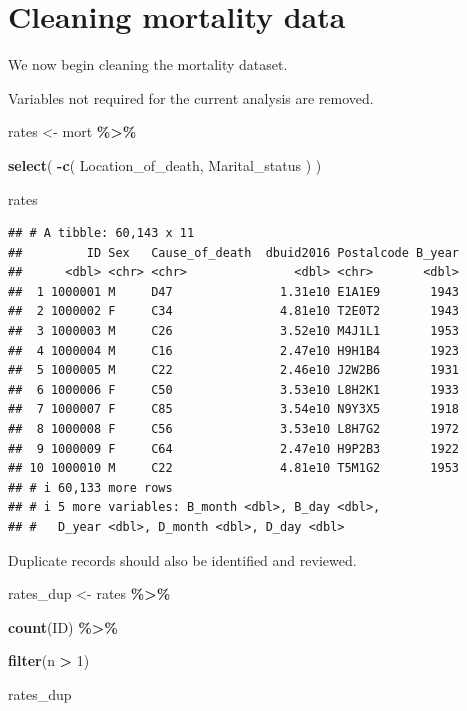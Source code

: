 \documentclass[
  11pt,
  oneside]{book}
\newenvironment{Shaded}{\begin{snugshade}}{\end{snugshade}}
\newcommand{\DecValTok}[1]{\textcolor[rgb]{0.00,0.00,0.81}{#1}}
\newcommand{\FunctionTok}[1]{\textcolor[rgb]{0.13,0.29,0.53}{\textbf{#1}}}
\newcommand{\NormalTok}[1]{#1}
\newcommand{\OtherTok}[1]{\textcolor[rgb]{0.56,0.35,0.01}{#1}}
\newcommand{\SpecialCharTok}[1]{\textcolor[rgb]{0.81,0.36,0.00}{\textbf{#1}}}
\begin{document}
\section{Cleaning mortality data}\label{cleaning-mortality-data}

We now begin cleaning the mortality dataset.

Variables not required for the current analysis are removed.

\begin{Shaded}
\begin{Highlighting}[]
\NormalTok{rates }\OtherTok{\textless{}{-}}\NormalTok{ mort }\SpecialCharTok{\%\textgreater{}\%}
  
  \FunctionTok{select}\NormalTok{(}
    \SpecialCharTok{{-}}\FunctionTok{c}\NormalTok{(}
\NormalTok{      Location\_of\_death,}
\NormalTok{      Marital\_status}
\NormalTok{    )}
\NormalTok{  )}

\NormalTok{rates}
\end{Highlighting}
\end{Shaded}

\begin{verbatim}
## # A tibble: 60,143 x 11
##         ID Sex   Cause_of_death  dbuid2016 Postalcode B_year
##      <dbl> <chr> <chr>               <dbl> <chr>       <dbl>
##  1 1000001 M     D47               1.31e10 E1A1E9       1943
##  2 1000002 F     C34               4.81e10 T2E0T2       1943
##  3 1000003 M     C26               3.52e10 M4J1L1       1953
##  4 1000004 M     C16               2.47e10 H9H1B4       1923
##  5 1000005 M     C22               2.46e10 J2W2B6       1931
##  6 1000006 F     C50               3.53e10 L8H2K1       1933
##  7 1000007 F     C85               3.54e10 N9Y3X5       1918
##  8 1000008 F     C56               3.53e10 L8H7G2       1972
##  9 1000009 F     C64               2.47e10 H9P2B3       1922
## 10 1000010 M     C22               4.81e10 T5M1G2       1953
## # i 60,133 more rows
## # i 5 more variables: B_month <dbl>, B_day <dbl>,
## #   D_year <dbl>, D_month <dbl>, D_day <dbl>
\end{verbatim}

Duplicate records should also be identified and reviewed.

\begin{Shaded}
\begin{Highlighting}[]
\NormalTok{rates\_dup }\OtherTok{\textless{}{-}}\NormalTok{ rates }\SpecialCharTok{\%\textgreater{}\%}
  
  \FunctionTok{count}\NormalTok{(ID) }\SpecialCharTok{\%\textgreater{}\%}
  
  \FunctionTok{filter}\NormalTok{(n }\SpecialCharTok{\textgreater{}} \DecValTok{1}\NormalTok{)}

\NormalTok{rates\_dup}
\end{Highlighting}
\end{Shaded}
\end{document}
